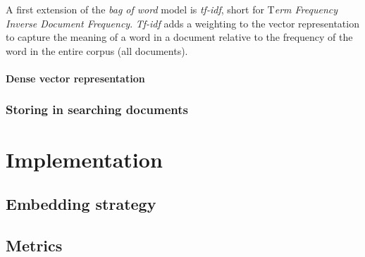 \documentclass{article}
\begin{document}
A first extension of the \textit{bag of word} model is \textit{tf-idf}, short for T\textit{erm Frequency Inverse Document Frequency}. \textit{Tf-idf} adds a weighting to the vector representation to capture the meaning of a word in a document relative to the frequency of the word in the entire corpus (all documents).

\paragraph{Dense vector representation}

\subsubsection{Storing in searching documents}

\section{Implementation}
\subsection{Embedding strategy}
\subsection{Metrics}

\newpage


\end{document}

